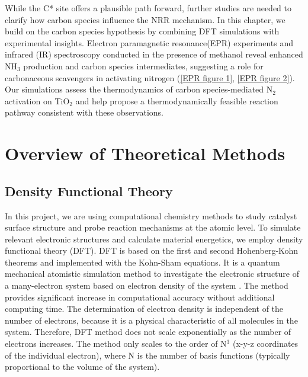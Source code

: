 While the C* site offers a plausible path forward, further studies are needed to clarify how carbon species influence the NRR mechanism. In this chapter, we build on the carbon species hypothesis by combining DFT simulations with experimental insights. Electron paramagnetic resonance(EPR) experiments and infrared (IR) spectroscopy conducted in the presence of methanol reveal enhanced NH$_3$ production and carbon species intermediates, suggesting a role for carbonaceous scavengers in activating nitrogen (\ref{EPR figure 1}, \ref{EPR figure 2}). Our simulations assess the thermodynamics of carbon species-mediated N$_2$ activation on TiO$_2$ and help propose a thermodynamically feasible reaction pathway consistent with these observations.



\section{Overview of Theoretical Methods}
\subsection{Density Functional Theory}
In this project, we are using computational chemistry methods to study catalyst surface structure and probe reaction mechanisms at the atomic level. To simulate relevant electronic structures and calculate material energetics, we employ density functional theory (DFT). DFT is based on the first and second Hohenberg-Kohn theorems and implemented with the Kohn-Sham equations. It is a quantum mechanical atomistic simulation method to investigate the electronic structure of a many-electron system based on electron density of the system \cite{Hohenberg_1964,Kohn_1965}. The method provides significant increase in computational accuracy without additional computing time. The determination of electron density is independent of the number of electrons, because it is a physical characteristic of all molecules in the system. Therefore, DFT method does not scale exponentially as the number of electrons increases. The method only scales to the order of N$^3$ \cite{TOULHOAT_2010} (x-y-z coordinates of the individual electron), where N is the number of basis functions (typically proportional to the volume of the system). 

